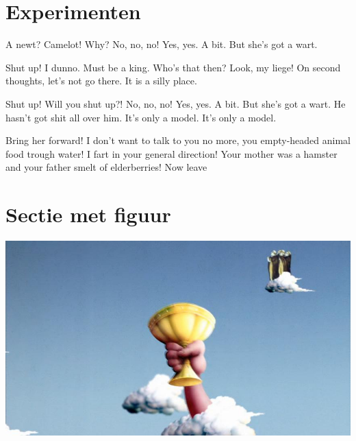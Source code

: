 \documentclass[a0,portrait]{a0poster}
\begin{document}
\begin{multicols}{2}
\color{Black} %
\color{HoGentAccent1} 
\section*{Experimenten}
\color{black}
A newt? Camelot! Why? No, no, no! Yes, yes. A bit. But she's got a wart.

Shut up! I dunno. Must be a king. Who's that then? Look, my liege! On second thoughts, let's not go there. It is a silly place.

Shut up! Will you shut up?! No, no, no! Yes, yes. A bit. But she's got a wart. He hasn't got shit all over him. It's only a model. It's only a model.

Bring her forward! I don't want to talk to you no more, you empty-headed animal food trough water! I fart in your general direction! Your mother was a hamster and your father smelt of elderberries! Now leave 



\color{HoGentAccent1} 
\section*{Sectie met figuur}
\color{black}


\begin{center}\vspace{1cm}
\includegraphics[width=1.0\linewidth]{grail}
\end{center}\vspace{1cm}





\end{multicols}
\end{document}
